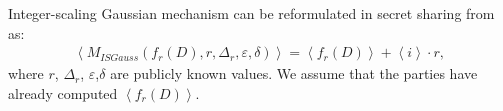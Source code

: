 
      Integer-scaling Gaussian mechanism can be reformulated in secret sharing from as:
      \begin{equation}
            \begin{split}
                  \left\langle M_{ISGauss}\left( f_r\left(D\right) ,r,\Delta_r,\varepsilon,\delta\right)\right\rangle =\left\langle f_r\left(D\right)\right\rangle + \left\langle i\right\rangle  \cdot r,
            \end{split}
      \end{equation}
      where $r$, $\Delta _r$, $\varepsilon$,$\delta$ are publicly known values. We assume that the parties have already computed $\left\langle {f_r\left(D\right)}\right\rangle$.



